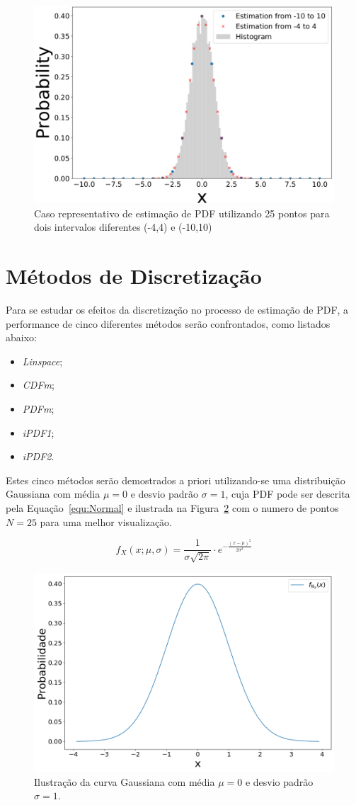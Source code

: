 \begin{figure}[H]
	\centering
	\includegraphics[width=0.6\linewidth]{figuras/linspace2}
	\caption{Caso representativo de estimação de PDF utilizando 25 pontos para dois intervalos diferentes (-4,4) e (-10,10)}
	\label{fig:figura1}
\end{figure}


\section{Métodos de Discretização} \label{cap:metodos}
Para se estudar os efeitos da discretização no processo de estimação de \ac{PDF}, a performance de cinco diferentes métodos serão confrontados, como listados abaixo: 
\begin{itemize}
	\item \textit{Linspace};
	\item \textit{CDFm};
	\item \textit{PDFm};
	\item \textit{iPDF1};
	\item \textit{iPDF2}.
\end{itemize}

Estes cinco métodos serão demostrados a priori  utilizando-se uma distribuição Gaussiana com média $\mu = 0$ e desvio padrão $\sigma = 1$, cuja \ac{PDF} pode ser descrita pela Equação~\eqref{equ:Normal} e ilustrada na Figura~\ref{fig:Gaussiana} com o numero de pontos $N = 25$ para uma melhor visualização.

\begin{equation}
{\displaystyle f_{X}(x;\mu,\sigma) = \frac{1}{\sigma\sqrt{2\pi}}\cdot e^{-\frac{(x-\mu)^2}{2\sigma^2}}}
\label{equ:Normal}
\end{equation}


\begin{figure}[H]
	\centering
	\includegraphics[width=0.6\linewidth]{./figuras/Normal}
	\caption{Ilustração da curva Gaussiana com média $\mu = 0$ e desvio padrão $\sigma = 1$.}
	\label{fig:Gaussiana}
\end{figure}

